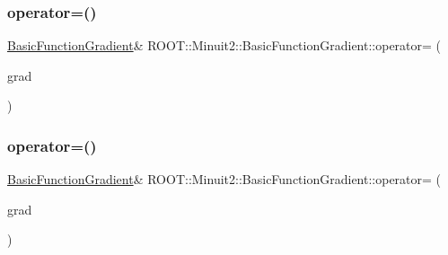\subsubsection{\texorpdfstring{operator=()}{operator=()}\hspace{0.1cm}{\footnotesize\ttfamily [1/3]}}
{\footnotesize\ttfamily \mbox{\hyperlink{classROOT_1_1Minuit2_1_1BasicFunctionGradient}{Basic\+Function\+Gradient}}\& R\+O\+O\+T\+::\+Minuit2\+::\+Basic\+Function\+Gradient\+::operator= (\begin{DoxyParamCaption}\item[{const \mbox{\hyperlink{classROOT_1_1Minuit2_1_1BasicFunctionGradient}{Basic\+Function\+Gradient}} \&}]{grad }\end{DoxyParamCaption})\hspace{0.3cm}{\ttfamily [inline]}}

\mbox{\label{classROOT_1_1Minuit2_1_1BasicFunctionGradient_a1bf2f76bab802466b8697136fbea33e4}} 
\subsubsection{\texorpdfstring{operator=()}{operator=()}\hspace{0.1cm}{\footnotesize\ttfamily [2/3]}}
{\footnotesize\ttfamily \mbox{\hyperlink{classROOT_1_1Minuit2_1_1BasicFunctionGradient}{Basic\+Function\+Gradient}}\& R\+O\+O\+T\+::\+Minuit2\+::\+Basic\+Function\+Gradient\+::operator= (\begin{DoxyParamCaption}\item[{const \mbox{\hyperlink{classROOT_1_1Minuit2_1_1BasicFunctionGradient}{Basic\+Function\+Gradient}} \&}]{grad }\end{DoxyParamCaption})\hspace{0.3cm}{\ttfamily [inline]}}

\mbox{\label{classROOT_1_1Minuit2_1_1BasicFunctionGradient_a1bf2f76bab802466b8697136fbea33e4}} 
